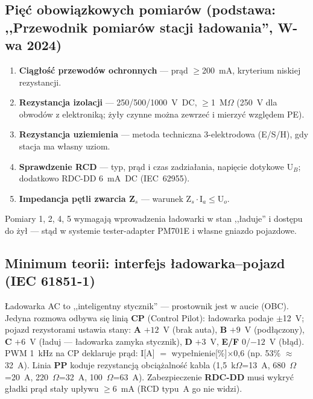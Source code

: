 \documentclass[11pt,a4paper]{article}
\newcommand{\ohm}{$\Omega$}
\begin{document}
\subsection{Pięć obowiązkowych pomiarów (podstawa: ,,Przewodnik pomiarów stacji ładowania'', W-wa 2024)}
\begin{enumerate}
\item \textbf{Ciągłość przewodów ochronnych} --- prąd $\ge$200~mA, kryterium niskiej rezystancji.
\item \textbf{Rezystancja izolacji} --- 250/500/1000~V~DC, $\ge$1~M\ohm{} (250~V dla obwodów
z elektroniką; żyły czynne można zewrzeć i mierzyć względem PE).
\item \textbf{Rezystancja uziemienia} --- metoda techniczna 3-elektrodowa (E/S/H), gdy stacja ma
własny uziom.
\item \textbf{Sprawdzenie RCD} --- typ, prąd i czas zadziałania, napięcie dotykowe U$_B$;
dodatkowo RDC-DD 6~mA~DC (IEC~62955).
\item \textbf{Impedancja pętli zwarcia Z$_s$} --- warunek Z$_s\cdot$I$_a\le$U$_o$.
\end{enumerate}
Pomiary 1, 2, 4, 5 wymagają wprowadzenia ładowarki w stan ,,ładuje'' i dostępu do żył --- stąd
w systemie tester-adapter PM701E i własne gniazdo pojazdowe.
\subsection{Minimum teorii: interfejs ładowarka--pojazd (IEC 61851-1)}
Ładowarka AC to ,,inteligentny stycznik'' --- prostownik jest w aucie (OBC). Jedyna rozmowa odbywa
się linią \textbf{CP} (Control Pilot): ładowarka podaje $\pm$12~V; pojazd rezystorami ustawia stany:
\textbf{A} $+12$~V (brak auta), \textbf{B} $+9$~V (podłączony), \textbf{C} $+6$~V (ładuj --- ładowarka
zamyka stycznik), \textbf{D} $+3$~V, \textbf{E/F} 0/$-12$~V (błąd). PWM 1~kHz na CP deklaruje prąd:
I[A] $=$ wypełnienie[\%]$\times$0,6 (np. 53\% $\approx$ 32~A). Linia \textbf{PP} koduje rezystancją
obciążalność kabla (1,5~k\ohm=13~A, 680~\ohm=20~A, 220~\ohm=32~A, 100~\ohm=63~A). Zabezpieczenie
\textbf{RDC-DD} musi wykryć gładki prąd stały upływu $\ge$6~mA (RCD typu~A go nie widzi).
\end{document}
